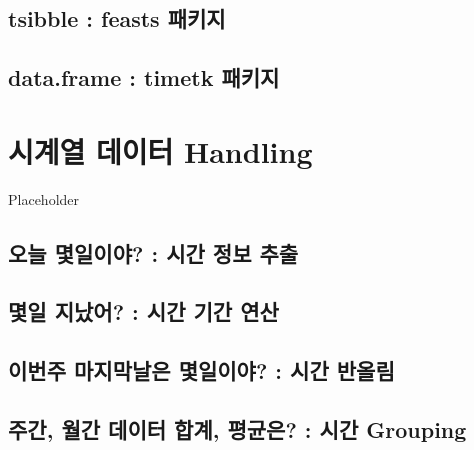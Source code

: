 \documentclass[
]{book}
\begin{document}
\hypertarget{tsibble-feasts-uxd328uxd0a4uxc9c0}{%
\section{tsibble : feasts 패키지}\label{tsibble-feasts-uxd328uxd0a4uxc9c0}}

\hypertarget{data.frame-timetk-uxd328uxd0a4uxc9c0}{%
\section{data.frame : timetk 패키지}\label{data.frame-timetk-uxd328uxd0a4uxc9c0}}

\hypertarget{uxc2dcuxacc4uxc5f4-uxb370uxc774uxd130-handling}{%
\chapter{시계열 데이터 Handling}\label{uxc2dcuxacc4uxc5f4-uxb370uxc774uxd130-handling}}

Placeholder

\hypertarget{uxc624uxb298-uxba87uxc77cuxc774uxc57c-uxc2dcuxac04-uxc815uxbcf4-uxcd94uxcd9c}{%
\section{오늘 몇일이야? : 시간 정보 추출}\label{uxc624uxb298-uxba87uxc77cuxc774uxc57c-uxc2dcuxac04-uxc815uxbcf4-uxcd94uxcd9c}}

\hypertarget{uxba87uxc77c-uxc9c0uxb0acuxc5b4-uxc2dcuxac04-uxae30uxac04-uxc5f0uxc0b0}{%
\section{몇일 지났어? : 시간 기간 연산}\label{uxba87uxc77c-uxc9c0uxb0acuxc5b4-uxc2dcuxac04-uxae30uxac04-uxc5f0uxc0b0}}

\hypertarget{uxc774uxbc88uxc8fc-uxb9c8uxc9c0uxb9c9uxb0a0uxc740-uxba87uxc77cuxc774uxc57c-uxc2dcuxac04-uxbc18uxc62cuxb9bc}{%
\section{이번주 마지막날은 몇일이야? : 시간 반올림}\label{uxc774uxbc88uxc8fc-uxb9c8uxc9c0uxb9c9uxb0a0uxc740-uxba87uxc77cuxc774uxc57c-uxc2dcuxac04-uxbc18uxc62cuxb9bc}}

\hypertarget{uxc8fcuxac04-uxc6d4uxac04-uxb370uxc774uxd130-uxd569uxacc4-uxd3c9uxade0uxc740-uxc2dcuxac04-grouping}{%
\section{주간, 월간 데이터 합계, 평균은? : 시간 Grouping}\label{uxc8fcuxac04-uxc6d4uxac04-uxb370uxc774uxd130-uxd569uxacc4-uxd3c9uxade0uxc740-uxc2dcuxac04-grouping}}
\end{document}
